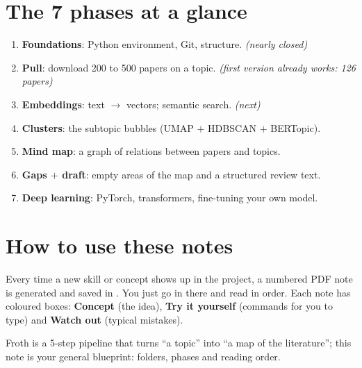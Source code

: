 \documentclass[11pt,a4paper]{article}
\begin{document}
\section{The 7 phases at a glance}

\begin{enumerate}
  \item[\textbf{F0}] \textbf{Foundations}: Python environment, Git, structure. \emph{(nearly closed)}
  \item[\textbf{F1}] \textbf{Pull}: download 200 to 500 papers on a topic. \emph{(first version already works: 126 papers)}
  \item[\textbf{F2}] \textbf{Embeddings}: text $\rightarrow$ vectors; semantic search. \emph{(next)}
  \item[\textbf{F3}] \textbf{Clusters}: the subtopic bubbles (UMAP $+$ HDBSCAN $+$ BERTopic).
  \item[\textbf{F4}] \textbf{Mind map}: a graph of relations between papers and topics.
  \item[\textbf{F5}] \textbf{Gaps $+$ draft}: empty areas of the map and a structured review text.
  \item[\textbf{F6}] \textbf{Deep learning}: PyTorch, transformers, fine-tuning your own model.
\end{enumerate}

\section{How to use these notes}

Every time a new skill or concept shows up in the project, a numbered PDF note is generated
and saved in . You just go in there and read in order. Each note has
coloured boxes: \textcolor{litblue}{\textbf{Concept}} (the idea),
\textcolor{litgreen}{\textbf{Try it yourself}} (commands for you to type) and
\textcolor{litorange}{\textbf{Watch out}} (typical mistakes).

\begin{resumen}
Froth is a 5-step pipeline that turns ``a topic'' into ``a map of the literature''; this
note is your general blueprint: folders, phases and reading order.
\end{resumen}
\end{document}
